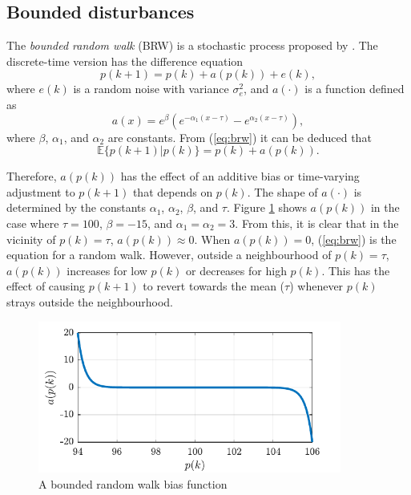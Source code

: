\subsection{Bounded disturbances} \label{sec:bounded}

The \textit{bounded random walk} (\gls{BRW}) is a stochastic process proposed by \cite{nicolau_stationary_2002}. The discrete-time version has the difference equation
\begin{equation} \label{eq:brw}
		p(k+1) = p(k) + a(p(k)) + e(k),
\end{equation}
where $e(k)$ is a random noise with variance $\sigma_e^2$, and $a(\cdot)$ is a function defined as
%
%
%
%
\begin{equation}
	a(x) = e^{\beta}\left(e^{-\alpha_{1}\left(x - \tau\right)} - e^{\alpha_{2}\left(x - \tau\right)}\right),
\end{equation}
where $\beta$, $\alpha_{1}$, and $\alpha_{2}$ are constants.  From (\ref{eq:brw}) it can be deduced that
\begin{equation}
	\mathbb{E}\{p(k+1)|p(k)\} = p(k) + a(p(k)).
\end{equation}

Therefore, $a(p(k))$ has the effect of an additive bias or time-varying adjustment to $p(k+1)$ that depends on $p(k)$. The shape of $a(\cdot)$ is determined by the constants $\alpha_{1}$,  $\alpha_{2}$, $\beta$, and $\tau$. Figure \ref{fig:brw-a} shows $a(p(k))$ in the case where $\tau=100$, $\beta=-15$, and $\alpha_{1}=\alpha_{2}=3$.  From this, it is clear that in the vicinity of $p(k)=\tau$, $a(p(k))\approx0$. When $a(p(k))=0$, (\ref{eq:brw}) is the equation for a random walk. However, outside a neighbourhood of $p(k)=\tau$, $a(p(k))$ increases for low $p(k)$ or decreases for high $p(k)$. This has the effect of causing $p(k+1)$ to revert towards the mean ($\tau$) whenever $p(k)$ strays outside the neighbourhood. 

\begin{figure}[ht]
	\centering
	\includegraphics[height=5cm]{images/brw_a.pdf}
	\caption{A bounded random walk bias function}
	\label{fig:brw-a}
\end{figure}

